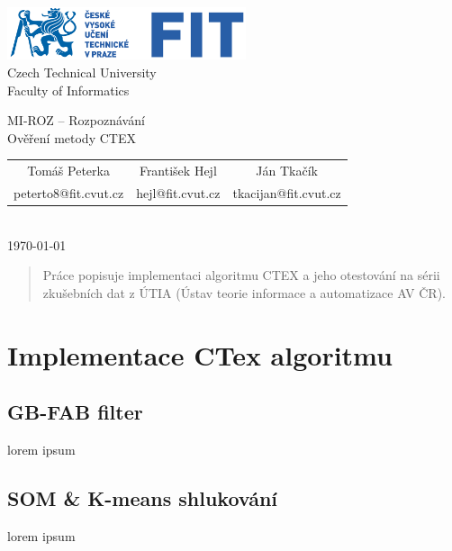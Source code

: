 \documentclass[fleqn,numbers=noenddot,headinclude,%
				11pt,a4paper,footinclude,%
				cleardoublepage=empty,abstractoff %
                ]{scrartcl}
\def\tomas{Tom\'{a}\v{s} Peterka}
\def\tomasid{peterto8}
\def\franta{Franti\v{s}ek Hejl}
\def\frantaid{hejl}
\def\jan{J\'{a}n Tka\v{c}\'{i}k}
\def\janid{tkacijan}
\def\frantaid{hejl}
\def\laboratoryname{Ov\v{e}\v{r}en\'{i} metody CTEX}
\def\date{\today}
\begin{document}
\pagestyle{empty}
\onecolumn
\null  %
\nointerlineskip  %
\vspace*{-1cm}
\begin{center}

\includegraphics[width=7cm,keepaspectratio=true]{./imgs/fit_logo.pdf}\\[0.3cm]
Czech Technical University\\
Faculty of Informatics

\vspace{1.2cm}

\Large MI-ROZ -- Rozpoznávání\\[0.5cm]
\laboratoryname \normalsize\\

\vspace{0.7cm}

\begin{tabular}{ccc}
\tomas & \franta & \jan \\
\tomasid @fit.cvut.cz & \frantaid @fit.cvut.cz & \janid @fit.cvut.cz \\
\end{tabular} \\[0.7cm]
\date
\end{center}
\vfill
\begin{abstract}
Práce popisuje implementaci algoritmu CTEX a jeho otestování na sérii zkušebních dat z ÚTIA (Ústav teorie informace a automatizace AV ČR).
\end{abstract}
\vfill
\tableofcontents

\clearpage

\pagestyle{scrheadings}
\setcounter{page}{1}

\section{Implementace CTex algoritmu}
\subsection{GB-FAB filter}
\label{sub:gb-fab}
lorem ipsum

\subsection{SOM \& K-means shlukování}
\label{sub:som}
lorem ipsum
\end{document}
